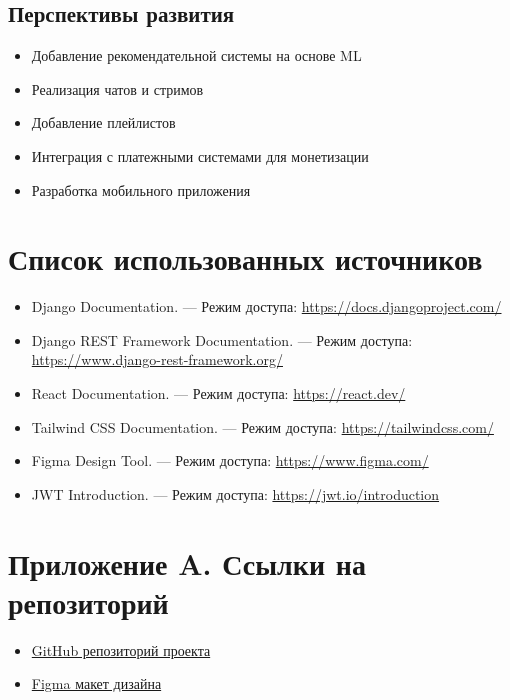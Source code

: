 \documentclass[12pt]{article}
\begin{document}
\subsection{Перспективы развития}

\begin{itemize}
    \item Добавление рекомендательной системы на основе ML
    \item Реализация чатов и стримов
    \item Добавление плейлистов
    \item Интеграция с платежными системами для монетизации
    \item Разработка мобильного приложения
\end{itemize}

\newpage

\section*{Список использованных источников}

\begin{itemize}
    \item Django Documentation. — Режим доступа: \url{https://docs.djangoproject.com/}
    \item Django REST Framework Documentation. — Режим доступа: \url{https://www.django-rest-framework.org/}
    \item React Documentation. — Режим доступа: \url{https://react.dev/}
    \item Tailwind CSS Documentation. — Режим доступа: \url{https://tailwindcss.com/}
    \item Figma Design Tool. — Режим доступа: \url{https://www.figma.com/}
    \item JWT Introduction. — Режим доступа: \url{https://jwt.io/introduction}
\end{itemize}

\newpage

\section*{Приложение A. Ссылки на репозиторий}

\begin{itemize}
    \item \href{https://github.com/yourusername/video-platform}{GitHub репозиторий проекта}
    \item \href{https://www.figma.com/design/...}{Figma макет дизайна}
\end{itemize}
\end{document}
